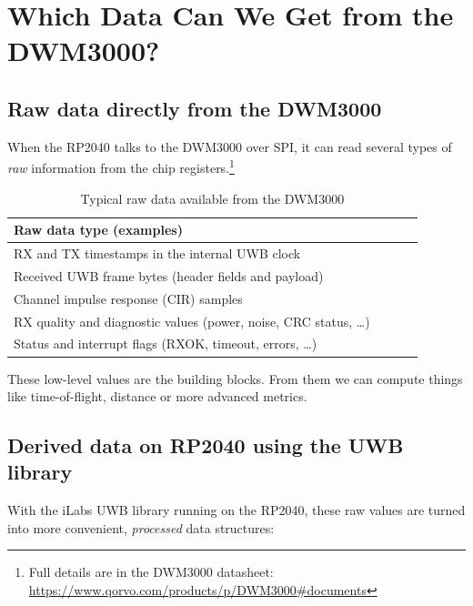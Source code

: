 \documentclass[a4paper,11pt]{article}
\begin{document}
\newpage

\section{Which Data Can We Get from the DWM3000?}
\label{sec:uwb-data}

\subsection{Raw data directly from the DWM3000}

When the RP2040 talks to the DWM3000 over SPI, it can read several types of
\emph{raw} information from the chip registers.\footnote{Full details are in the
	DWM3000 datasheet: \url{https://www.qorvo.com/products/p/DWM3000\#documents}}

\begin{table}[h]
	\centering
	\caption{Typical raw data available from the DWM3000}
	\label{tab:uwb-raw-data-simple}
	\begin{tabular}{p{0.9\linewidth}}
		\toprule
		\textbf{Raw data type (examples)} \\
		\midrule
		RX and TX timestamps in the internal UWB clock \\
		Received UWB frame bytes (header fields and payload) \\
		Channel impulse response (CIR) samples \\
		RX quality and diagnostic values (power, noise, CRC status, \dots) \\
		Status and interrupt flags (RXOK, timeout, errors, \dots) \\
		\bottomrule
	\end{tabular}
\end{table}

These low-level values are the building blocks. From them we can compute things
like time-of-flight, distance or more advanced metrics.

\subsection{Derived data on RP2040 using the UWB library}
\label{subsec:uwb-derived-data}

With the iLabs UWB library running on the RP2040, these raw values are turned
into more convenient, \emph{processed} data structures:
\end{document}

